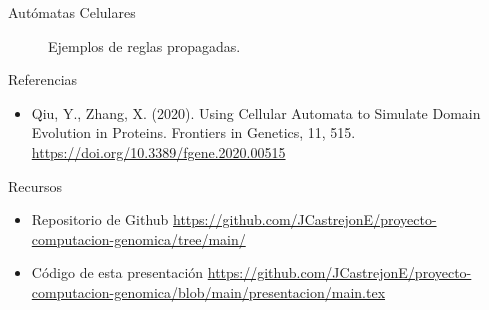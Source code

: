 \documentclass{beamer}
\begin{document}
\begin{frame}{Autómatas Celulares}
\begin{figure}[ht]
\centering

\caption{Ejemplos de reglas propagadas.}
\label{fig:direct_svg}
\end{figure}
\end{frame}


\begin{frame}{Referencias}
\begin{itemize}
\item Qiu, Y., Zhang, X. (2020). Using Cellular Automata to Simulate Domain Evolution in Proteins. Frontiers in Genetics, 11, 515. \url{https://doi.org/10.3389/fgene.2020.00515}
\end{itemize}
\end{frame}

\begin{frame}{Recursos}
\begin{itemize}
\item Repositorio de Github \url{https://github.com/JCastrejonE/proyecto-computacion-genomica/tree/main/}
\item Código de esta presentación \url{https://github.com/JCastrejonE/proyecto-computacion-genomica/blob/main/presentacion/main.tex}
\end{itemize}
\end{frame}
\end{document}
